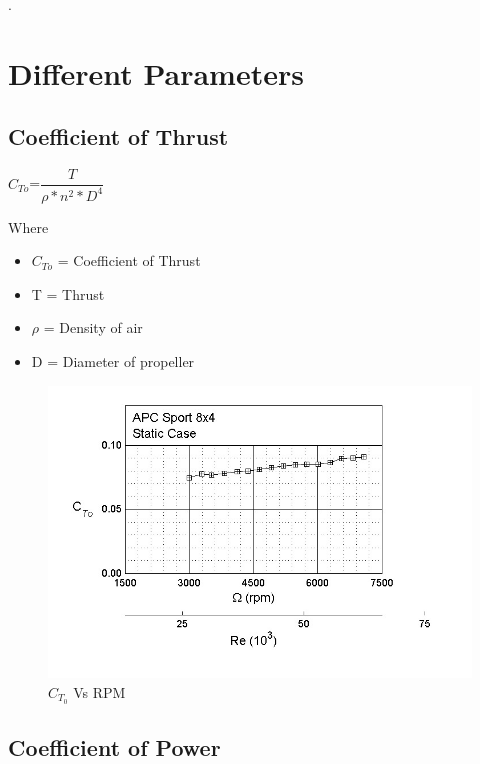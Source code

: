 .









\section{Different Parameters}

\subsection{Coefficient of Thrust}

$C_{To}$=$\dfrac{T}{\rho*n^{2}*D^{4}}$

Where

\begin{itemize}
	
\item  $C_{To}$ = Coefficient of Thrust
\item  T = Thrust
\item  $\rho$ = Density of air
\item  D = Diameter of propeller

\end{itemize} 

\begin{figure}[H]
	\centering
	\includegraphics[scale=.5]{graph2}
	
	\caption{$C_{T_{0}}$ Vs  RPM }
	\label{graph}
\end{figure}


\newpage



\subsection{Coefficient of Power}

